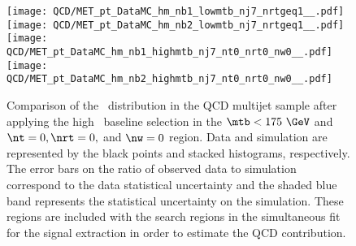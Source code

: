 \begin{figure}[!htb]
	\begin{center}
  \texttt{[image: QCD/MET\_pt\_DataMC\_hm\_nb1\_lowmtb\_nj7\_nrtgeq1\_\_.pdf]}
  \texttt{[image: QCD/MET\_pt\_DataMC\_hm\_nb2\_lowmtb\_nj7\_nrtgeq1\_\_.pdf]} \\
  \texttt{[image: QCD/MET\_pt\_DataMC\_hm\_nb1\_highmtb\_nj7\_nt0\_nrt0\_nw0\_\_.pdf]}
  \texttt{[image: QCD/MET\_pt\_DataMC\_hm\_nb2\_highmtb\_nj7\_nt0\_nrt0\_nw0\_\_.pdf]} \\
	\end{center}
	\caption[QCD Multijet HM Control Region]{Comparison of the \met~distribution in the QCD multijet sample after applying the high \dm~baseline selection in the $\mtb<175~\GeV$ and $\nt=0, \nrt=0,$ and $\nw=0$ region. Data and simulation are represented by the black points and stacked histograms, respectively. The error bars on the ratio of observed data to simulation correspond to the data statistical uncertainty and the shaded blue band represents the statistical uncertainty on the simulation. These regions are included with the search regions in the simultaneous fit for the signal extraction in order to estimate the QCD contribution.
	 }
	\label{fig:qcd-cr-datavsmc-hm-nt0-nrt0-nw0}
\end{figure}

